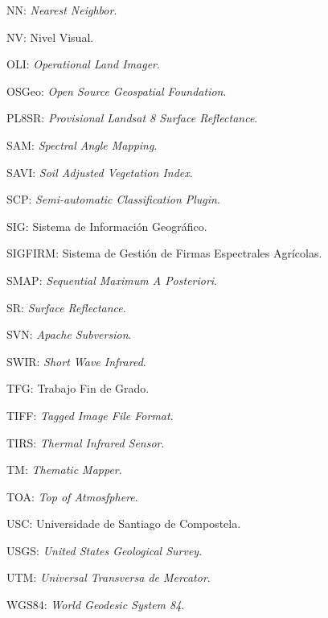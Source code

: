 NN: \textit{Nearest Neighbor}.

NV: Nivel Visual.

OLI: \textit{Operational Land Imager}.

OSGeo: \textit{Open Source Geospatial Foundation}.

PL8SR: \textit{Provisional Landsat 8 Surface Reflectance}.

SAM: \textit{Spectral Angle Mapping}.

SAVI: \textit{Soil Adjusted Vegetation Index}.

SCP: \textit{Semi-automatic Classification Plugin}.

SIG: Sistema de Información Geográfico.

SIGFIRM: Sistema de Gestión de Firmas Espectrales Agrícolas.

SMAP: \textit{Sequential Maximum A Posteriori}.

SR: \textit{Surface Reflectance}.

SVN: \textit{Apache Subversion}.

SWIR: \textit{Short Wave Infrared}.

TFG: Trabajo Fin de Grado.

TIFF: \textit{Tagged Image File Format}.

TIRS: \textit{Thermal Infrared Sensor}.

TM: \textit{Thematic Mapper}.

TOA: \textit{Top of Atmosfphere}.

USC: Universidade de Santiago de Compostela.

USGS: \textit{United States Geological Survey}.

UTM: \textit{Universal Transversa de Mercator}.

WGS84: \textit{World Geodesic System 84}.